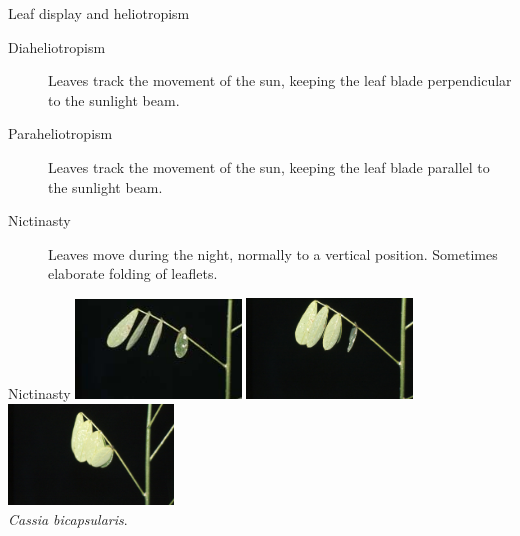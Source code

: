 \documentclass[10pt]{beamer}
\begin{document}
\begin{frame}{Leaf display and heliotropism}
    \begin{description}
        \item[Diaheliotropism] Leaves track the movement of the
        sun, keeping the leaf blade perpendicular to the sunlight beam.
        \item[Paraheliotropism] Leaves track the movement of the
        sun, keeping the leaf blade parallel to the sunlight beam.
        \item[Nictinasty] Leaves move during the night, normally
        to a vertical position. Sometimes elaborate folding of
        leaflets.
    \end{description}
\end{frame}

\begin{frame}{Nictinasty}
    \centering\includegraphics[width=0.33\textwidth]{photos/Cassia_1}%
    \includegraphics[width=0.33\textwidth]{photos/Cassia_2}%
    \includegraphics[width=0.33\textwidth]{photos/Cassia_3}\\
    \textit{Cassia bicapsularis}.
\end{frame}
\end{document}
